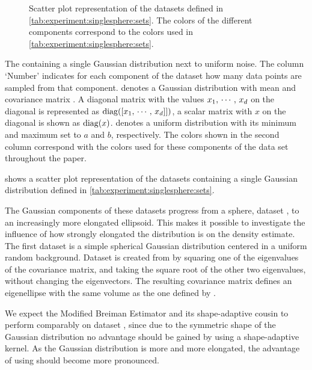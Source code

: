 
\begin{figure*}
	\centering
	
	\caption{Scatter plot representation of the datasets defined in \cref{tab:experiment:singlesphere:sets}. The colors of the different components correspond to the colors used in \cref{tab:experiment:singlesphere:sets}.}
	\label{fig:experiment:singlesphere:sets}
\end{figure*}

\begin{table*}
	\centering
	
	\caption{The containing a single Gaussian distribution next to uniform noise. The column `Number' indicates for each component of the dataset how many data points are sampled from that component. \gaussDist{\varMean}{\varCovarianceMatrix} denotes a Gaussian distribution with mean \varMean and covariance matrix \varCovarianceMatrix. A diagonal matrix with the values $x_1,\, \cdots,\, x_d$ on the diagonal is represented as $\operatorname{diag}([x_1,\,\cdots,\,x_d]])$, a scalar matrix with $x$ on the diagonal is shown as $\operatorname{diag}(x)$.  denotes a uniform distribution with its minimum and maximum set to $a$ and $b$, respectively. The colors shown in the second column correspond with the colors used for these components of the data set throughout the paper.} 	
	\label{tab:experiment:singlesphere:sets}
\end{table*}

 shows a scatter plot representation of the datasets containing a single Gaussian distribution defined in \cref{tab:experiment:singlesphere:sets}. 

The Gaussian components of these datasets progress from a sphere, \ie dataset \ferdosiOne, to an increasingly more elongated ellipsoid. This makes it possible to investigate the influence of how strongly elongated the distribution is on the density estimate. 
The first dataset is a simple spherical Gaussian distribution centered in a uniform random background. 
Dataset \baakmanOne is created from \ferdosiOne by squaring one of the eigenvalues of the covariance matrix, and taking the square root of the other two eigenvalues, without changing the eigenvectors. The resulting covariance matrix defines an eigenellipse with the same volume as the one defined by \ferdosiOne.


	We expect the Modified Breiman Estimator and its shape-adaptive cousin to perform comparably on dataset \ferdosiOne, since due to the symmetric shape of the Gaussian distribution no advantage should be gained by using a shape-adaptive kernel. 
	As the Gaussian distribution is more and more elongated, the advantage of using \sambe should become more pronounced. 
